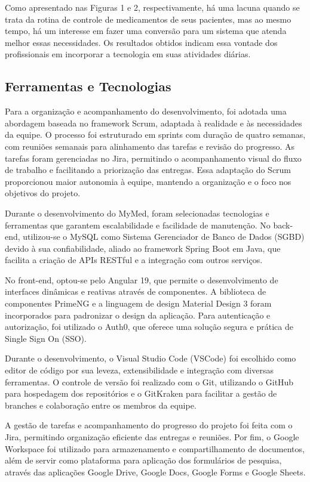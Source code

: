 \documentclass[
	article,			%
	12pt,				%
	oneside,			%
	a4paper,			%
    BIBLATEX,           %
	english,			%
	brazil,				%
	sumario=tradicional
	]{abntex2}
\newcommand\nomeprojeto{MyMed}
\begin{document}
\break

Como apresentado nas Figuras 1 e 2, respectivamente, há uma lacuna quando se trata da rotina de controle de medicamentos de seus pacientes, mas ao mesmo tempo, há um interesse em fazer uma conversão para um sistema que atenda melhor essas necessidades. Os resultados obtidos indicam essa vontade dos profissionais em incorporar a tecnologia em suas atividades diárias.

\subsection{Ferramentas e Tecnologias}

Para a organização e acompanhamento do desenvolvimento, foi adotada uma abordagem baseada no framework Scrum, adaptada à realidade e às necessidades da equipe. O processo foi estruturado em sprints com duração de quatro semanas, com reuniões semanais para alinhamento das tarefas e revisão do progresso. As tarefas foram gerenciadas no Jira, permitindo o acompanhamento visual do fluxo de trabalho e facilitando a priorização das entregas. Essa adaptação do Scrum proporcionou maior autonomia à equipe, mantendo a organização e o foco nos objetivos do projeto.

Durante o desenvolvimento do \nomeprojeto, foram selecionadas tecnologias e ferramentas que garantem escalabilidade e facilidade de manutenção. No back-end, utilizou-se o MySQL como Sistema Gerenciador de Banco de Dados (SGBD) devido à sua confiabilidade, aliado ao framework Spring Boot em Java, que facilita a criação de APIs RESTful e a integração com outros serviços.

No front-end, optou-se pelo Angular 19, que permite o desenvolvimento de interfaces dinâmicas e reativas através de componentes. A biblioteca de componentes PrimeNG e a linguagem de design Material Design 3 foram incorporados para padronizar o design da aplicação. Para autenticação e autorização, foi utilizado o Auth0, que oferece uma solução segura e prática de Single Sign On (SSO).

Durante o desenvolvimento, o Visual Studio Code (VSCode) foi escolhido como editor de código por sua leveza, extensibilidade e integração com diversas ferramentas. O controle de versão foi realizado com o Git, utilizando o GitHub para hospedagem dos repositórios e o GitKraken para facilitar a gestão de branches e colaboração entre os membros da equipe.

A gestão de tarefas e acompanhamento do progresso do projeto foi feita com o Jira, permitindo organização eficiente das entregas e reuniões. Por fim, o Google Workspace foi utilizado para armazenamento e compartilhamento de documentos, além de servir como plataforma para aplicação dos formulários de pesquisa, através das aplicações Google Drive, Google Docs, Google Forms e Google Sheets.
	
\end{document}
